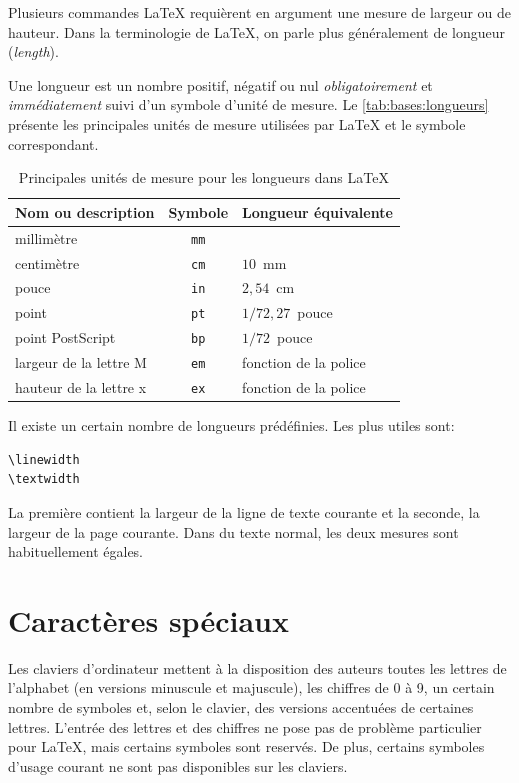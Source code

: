 Plusieurs commandes {\LaTeX} requièrent en argument une mesure de
largeur ou de hauteur. Dans la terminologie de {\LaTeX}, on parle plus
généralement de longueur (\emph{length}).

Une longueur est un nombre positif, négatif ou nul
\emph{obligatoirement} et \emph{immédiatement} suivi d'un symbole
d'unité de mesure. Le \autoref{tab:bases:longueurs} présente les
principales unités de mesure utilisées par {\LaTeX} et le symbole
correspondant.

\begin{table}
  \caption{Principales unités de mesure pour les longueurs dans
    {\LaTeX}}
  \label{tab:bases:longueurs}
  \centering
  \begin{tabular}{lcl}
    \toprule
    Nom ou description & Symbole & Longueur équivalente \\
    \midrule
    millimètre & \texttt{mm} \\
    centimètre & \texttt{cm} & $10$~mm \\
    pouce      & \texttt{in} & $2,54$~cm \\
    point      & \texttt{pt} & $1/72,27$~pouce \\
    point PostScript     & \texttt{bp}   & $1/72$~pouce \\
    largeur de la lettre M & \texttt{em} & fonction de la police \\
    hauteur de la lettre x & \texttt{ex} & fonction de la police \\
    \bottomrule
  \end{tabular}
\end{table}

Il existe un certain nombre de longueurs prédéfinies. Les plus utiles
sont:
\begin{lstlisting}
\linewidth
\textwidth
\end{lstlisting}
La première contient la largeur de la ligne de texte courante et la
seconde, la largeur de la page courante. Dans du texte normal, les
deux mesures sont habituellement égales.


\section{Caractères spéciaux}
\label{sec:bases:caracteres}

Les claviers d'ordinateur mettent à la disposition des auteurs toutes
les lettres de l'alphabet (en versions minuscule et majuscule), les
chiffres de 0 à 9, un certain nombre de symboles et, selon le clavier,
des versions accentuées de certaines lettres. L'entrée des lettres et
des chiffres ne pose pas de problème particulier pour {\LaTeX}, mais
certains symboles sont reservés. De plus, certains symboles d'usage
courant ne sont pas disponibles sur les claviers.

